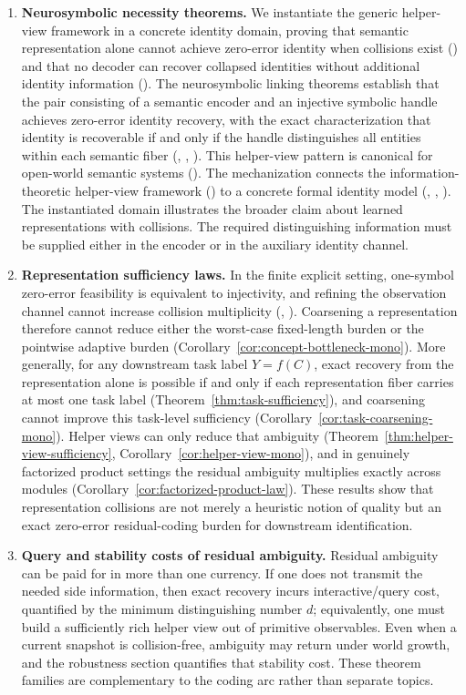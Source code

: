 \begin{enumerate}
\item \textbf{Neurosymbolic necessity theorems.} We instantiate the generic helper-view framework in a concrete identity domain, proving that semantic representation alone cannot achieve zero-error identity when collisions exist () and that no decoder can recover collapsed identities without additional identity information (). The neurosymbolic linking theorems establish that the pair consisting of a semantic encoder and an injective symbolic handle achieves zero-error identity recovery, with the exact characterization that identity is recoverable if and only if the handle distinguishes all entities within each semantic fiber (, , ). This helper-view pattern is canonical for open-world semantic systems (). The mechanization connects the information-theoretic helper-view framework () to a concrete formal identity model (, , ). The instantiated domain illustrates the broader claim about learned representations with collisions. The required distinguishing information must be supplied either in the encoder or in the auxiliary identity channel.

\item \textbf{Representation sufficiency laws.} In the finite explicit setting, one-symbol zero-error feasibility is equivalent to injectivity, and refining the observation channel cannot increase collision multiplicity (, ). Coarsening a representation therefore cannot reduce either the worst-case fixed-length burden or the pointwise adaptive burden (Corollary~\ref{cor:concept-bottleneck-mono}). More generally, for any downstream task label $Y=f(C)$, exact recovery from the representation alone is possible if and only if each representation fiber carries at most one task label (Theorem~\ref{thm:task-sufficiency}), and coarsening cannot improve this task-level sufficiency (Corollary~\ref{cor:task-coarsening-mono}). Helper views can only reduce that ambiguity (Theorem~\ref{thm:helper-view-sufficiency}, Corollary~\ref{cor:helper-view-mono}), and in genuinely factorized product settings the residual ambiguity multiplies exactly across modules (Corollary~\ref{cor:factorized-product-law}). These results show that representation collisions are not merely a heuristic notion of quality but an exact zero-error residual-coding burden for downstream identification.

\item \textbf{Query and stability costs of residual ambiguity.} Residual ambiguity can be paid for in more than one currency. If one does not transmit the needed side information, then exact recovery incurs interactive/query cost, quantified by the minimum distinguishing number $d$; equivalently, one must build a sufficiently rich helper view out of primitive observables. Even when a current snapshot is collision-free, ambiguity may return under world growth, and the robustness section quantifies that stability cost. These theorem families are complementary to the coding arc rather than separate topics.
\end{enumerate}

